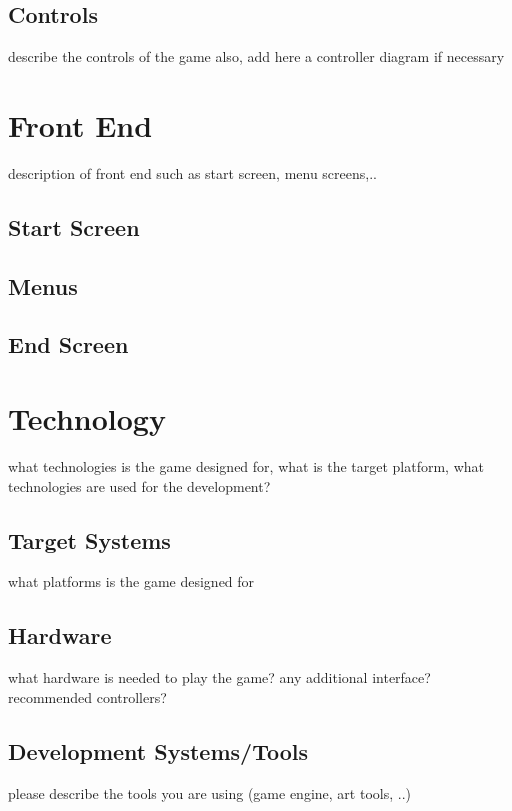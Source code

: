 \documentclass[a4paper]{scrreprt}
\begin{document}
\section{Controls}
describe the controls of the game 
also, add here a controller diagram if necessary 



\chapter{Front End}
description of front end such as start screen, menu screens,..  

\section{Start Screen}

\section{Menus}

\section{End Screen}



\chapter{Technology}
what technologies is the game designed for, what is the target platform, what technologies are used for the development? 

\section{Target Systems}
what platforms is the game designed for

\section{Hardware}
what hardware is needed to play the game? any additional interface? recommended controllers? 

\section{Development Systems/Tools}
please describe the tools you are using (game engine, art tools, ..) 
\end{document}
